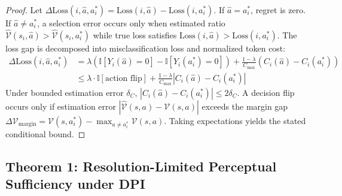\documentclass[11pt]{article}
\begin{document}
\begin{proof}
Let $\Delta \text{Loss}(i, \hat{a}, a^*_i) = \text{Loss}(i, \hat{a}) - \text{Loss}(i, a^*_i)$. If $\hat{a} = a^*_i$, regret is zero. If $\hat{a} \neq a^*_i$, a selection error occurs only when estimated ratio $\hat{\mathcal{V}}(s_i, \hat{a}) > \hat{\mathcal{V}}(s_i, a^*_i)$ while true loss satisfies $\text{Loss}(i, \hat{a}) > \text{Loss}(i, a^*_i)$. The loss gap is decomposed into misclassification loss and normalized token cost:
\begin{align}
\Delta \text{Loss}(i, \hat{a}, a^*_i) &= \lambda (\mathbb{I}[Y_i(\hat{a})=0] - \mathbb{I}[Y_i(a^*_i)=0]) + \frac{1 - \lambda}{C_{\max}} (C_i(\hat{a}) - C_i(a^*_i)) \\
&\le \lambda \cdot \mathbb{I}[\text{action flip}] + \frac{1 - \lambda}{C_{\max}} |C_i(\hat{a}) - C_i(a^*_i)|
\end{align}
Under bounded estimation error $\delta_C$, $|C_i(\hat{a}) - C_i(a^*_i)| \le 2\delta_C$. A decision flip occurs only if estimation error $|\hat{\mathcal{V}}(s, a) - \mathcal{V}(s, a)|$ exceeds the margin gap $\Delta \mathcal{V}_{\text{margin}} = \mathcal{V}(s, a^*_i) - \max_{a \neq a^*_i} \mathcal{V}(s, a)$. Taking expectations yields the stated conditional bound.
\end{proof}

\subsection{Theorem 1: Resolution-Limited Perceptual Sufficiency under DPI}
\end{document}
